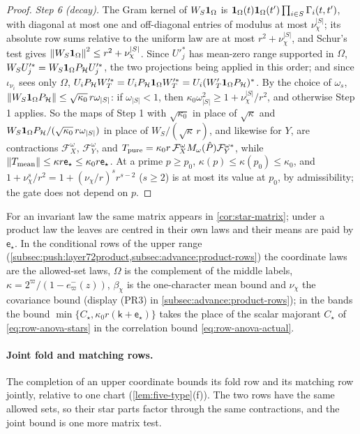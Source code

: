 \begin{proof}
\emph{Step 6 (decay).} The Gram kernel of $W_S\mathbf 1_\Omega$ is
$\mathbf 1_\Omega(t)\mathbf 1_\Omega(t')\prod_{i\in S}\Gamma_i(t,t')$, with diagonal at most one and
off-diagonal entries of modulus at most $\nu_\chi^{|S|}$; its absolute row sums relative
to the uniform law are at most $r^2+\nu_\chi^{|S|}$, and Schur's test gives
$\left\|W_S\mathbf 1_\Omega\right\|^2\le r^2+\nu_\chi^{|S|}$. Since $U'^*_j$ has mean-zero range
supported in $\Omega$, $W_SU'^*_j=W_S\mathbf 1_\Omega P_{\mathcal H}U'^*_j$, the two
projections being applied in this order; and since $\iota_{\nu_i}$ sees only $\Omega$,
$U_iP_{\mathcal H}W'^*_T=U_iP_{\mathcal H}\mathbf 1_\Omega W'^*_T=U_i(W'_T\mathbf 1_\Omega
P_{\mathcal H})^*$. By the choice of $\omega_s$,
$\left\|W_S\mathbf 1_\Omega P_{\mathcal H}\right\|\le\sqrt{\kappa_0}\,r\omega_{|S|}$: if
$\omega_{|S|}<1$, then $\kappa_0\omega_{|S|}^2\ge1+\nu_\chi^{|S|}/r^2$, and otherwise
Step 1 applies. So the maps of Step 1 with $\sqrt{\kappa_0}$ in place of $\sqrt\kappa$
and $W_S\mathbf 1_\Omega P_{\mathcal H}/(\sqrt{\kappa_0}\,r\omega_{|S|})$ in place of
$W_S/(\sqrt\kappa\,r)$, and likewise for $Y$, are contractions $\mathcal F^\omega_X$,
$\mathcal F^\omega_Y$, and $T_{\rm pure}=\kappa_0r\,\mathcal F^\omega_XM_\omega(\hat P)
\mathcal F^{\omega*}_Y$, while $\left\|T_{\rm mean}\right\|\le\kappa r\mathsf e_\star\le\kappa_0r
\mathsf e_\star$. At a prime $p\ge p_0$, $\kappa(p)\le\kappa(p_0)\le\kappa_0$, and
$1+\nu_\chi^s/r^2=1+(\nu_\chi/r)^sr^{s-2}$ ($s\ge2$) is at most its value at $p_0$, by
admissibility; the gate does not depend on $p$.
\end{proof}

For an invariant law the same matrix appears in \cref{cor:star-matrix}; under a
product law the leaves are centred in their own laws and their means are paid by
$\mathsf e_\star$. In the conditional rows of the upper range
(\cref{subsec:push:layer72product,subsec:advance:product-rows}) the coordinate laws
are the allowed-set laws, $\Omega$ is the complement of the middle labels,
$\kappa=2^\varpi/(1-e^-_\varpi(z))$, $\beta_\chi$ is the one-character mean bound and $\nu_\chi$
the covariance bound (display (PR3) in
\cref{subsec:advance:product-rows}); in the bands the bound
$\min\{C_\star,
\kappa_0r(\mathsf k+\mathsf e_\star)\}$ takes the place of the scalar majorant $C_\star$
of \eqref{eq:row-anova-stars} in the correlation bound \eqref{eq:row-anova-actual}.

\paragraph{Joint fold and matching rows.}
The completion of an upper coordinate bounds its fold row and its matching row
jointly, relative to one chart (\cref{lem:five-type}(f)). The two rows have the same
allowed sets, so their star parts factor through the same contractions, and the joint
bound is one more matrix test.

